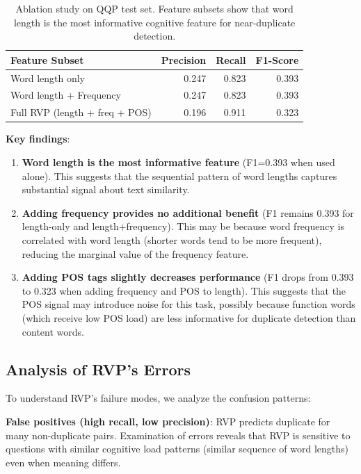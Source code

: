 \documentclass[11pt,letterpaper]{article}
\begin{document}
\begin{table}[!htbp]
\centering
\caption{Ablation study on QQP test set. Feature subsets show that word length is the most informative cognitive feature for near-duplicate detection.}
\label{tab:ablation}
\begin{tabular}{lrrr}
\toprule
Feature Subset & Precision & Recall & F1-Score \\
\midrule
Word length only & 0.247 & 0.823 & 0.393 \\
Word length + Frequency & 0.247 & 0.823 & 0.393 \\
Full RVP (length + freq + POS) & 0.196 & 0.911 & 0.323 \\
\bottomrule
\end{tabular}
\end{table}

\textbf{Key findings}:

\begin{enumerate}
\item \textbf{Word length is the most informative feature} (F1=0.393 when used alone). This suggests that the sequential pattern of word lengths captures substantial signal about text similarity.

\item \textbf{Adding frequency provides no additional benefit} (F1 remains 0.393 for length-only and length+frequency). This may be because word frequency is correlated with word length (shorter words tend to be more frequent), reducing the marginal value of the frequency feature.

\item \textbf{Adding POS tags slightly decreases performance} (F1 drops from 0.393 to 0.323 when adding frequency and POS to length). This suggests that the POS signal may introduce noise for this task, possibly because function words (which receive low POS load) are less informative for duplicate detection than content words.
\end{enumerate}

\subsection{Analysis of RVP's Errors}

To understand RVP's failure modes, we analyze the confusion patterns:

\textbf{False positives (high recall, low precision)}: RVP predicts duplicate for many non-duplicate pairs. Examination of errors reveals that RVP is sensitive to questions with similar cognitive load patterns (similar sequence of word lengths) even when meaning differs.
\end{document}
